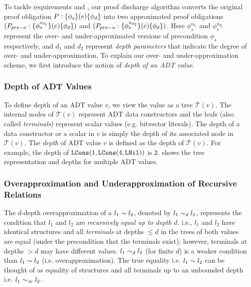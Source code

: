 To tackle requirements  and ,
our proof discharge algorithm converts the original proof obligation $P: \{\phi_s\}(e)\{\phi_d\}$
into two approximated proof obligations $(P_{pre-o}: \{\phi^{o_{d_1}}_s\}(e)\{\phi_d\})$
and $(P_{pre-u}: \{\phi^{u_{d_2}}_s\}(e)\{\phi_d\})$.
Here $\phi^{o_{d_1}}_s$ and $\phi^{u_{d_2}}_s$ represent the over- and under-approximated
versions of precondition $\phi_s$ respectively, and $d_1$ and $d_2$ represent
{\em depth parameters} that indicate the degree of over- and under-approximation.
To explain our over- and under-approximation scheme, we
first introduce the notion of {\em depth of an ADT value}.

\subsubsection{Depth of ADT Values}
To define depth of an ADT value $v$, we view the value as a tree $\mathcal{T}(v)$.
The internal nodes of $\mathcal{T}(v)$ represent ADT data constructors and
the leafs (also called {\em terminals}) represent scalar values (e.g. bitvector literals).
The depth of a data constructor or a scalar in $v$ is simply the depth of
its associated node in $\mathcal{T}(v)$.
The {\em depth} of ADT value $v$ is defined as the depth of $\mathcal{T}(v)$.
For example, the depth of ${\tt LCons}(1, {\tt LCons}(4, {\tt LNil}))$ is {\tt 2}.
 shows the tree representation and depths for multiple ADT values.



\subsubsection{Overapproximation and Underapproximation of Recursive Relations}
The $d$-depth overapproximation of a \recursiveRelation{} $l_1 \sim{} l_2$,
denoted by $l_1 \sim_d l_2$, represents the condition that
$l_1$ and $l_2$ are {\em recursively equal up to depth $d$}. i.e.,
$l_1$ and $l_2$ have identical structures and all
{\em terminals} at depths $\leq d$ in the trees of both values
are equal (under the precondition that the terminals exist);
however, terminals at depths $>d$ may have different values.
$l_1 \sim_d l_2$ (for finite $d$) is a weaker
condition than $l_1 \sim{} l_2$ (i.e. overapproximation).
The true equality i.e. $l_1 \sim{} l_2$ can be thought of as equality of structures
and all terminals up to an unbounded depth i.e. $l_1 \sim_\infty l_2$.

